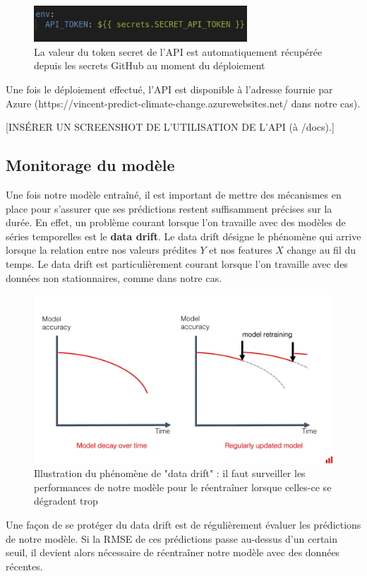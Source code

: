 \documentclass[french]{article}
\begin{document}
    \begin{figure}[h]
        \includegraphics[width=8cm]{gh_action}
        \centering
        \caption{La valeur du token secret de l'API est automatiquement récupérée depuis les secrets GitHub au moment du déploiement}
        \centering
    \end{figure}

    Une fois le déploiement effectué, l'API est disponible à l'adresse fournie par Azure (https://vincent-predict-climate-change.azurewebsites.net/ dans notre cas).

    [INSÉRER UN SCREENSHOT DE L'UTILISATION DE L'API (à /docs).]

    \subsection{Monitorage du modèle}
    
    Une fois notre modèle entraîné, il est important de mettre des mécanismes en place pour s'assurer que ses prédictions restent suffisamment précises sur la durée. En effet, un problème courant lorsque l'on travaille avec des modèles de séries temporelles est le \textbf{data drift}. Le data drift désigne le phénomène qui arrive lorsque la relation entre nos valeurs prédites $Y$ et nos features $X$ change au fil du temps. Le data drift est particulièrement courant lorsque l'on travaille avec des données non stationnaires, comme dans notre cas.
    \begin{figure}[h]
        \includegraphics[width=12cm]{data_drift}
        \centering
        \caption{Illustration du phénomène de "data drift" : il faut surveiller les performances de notre modèle pour le réentraîner lorsque celles-ce se dégradent trop}
        \centering
    \end{figure}
    Une façon de se protéger du data drift est de régulièrement évaluer les prédictions de notre modèle. Si la RMSE de ces prédictions passe au-dessus d'un certain seuil, il devient alors nécessaire de réentraîner notre modèle avec des données récentes.
    
\end{document}
